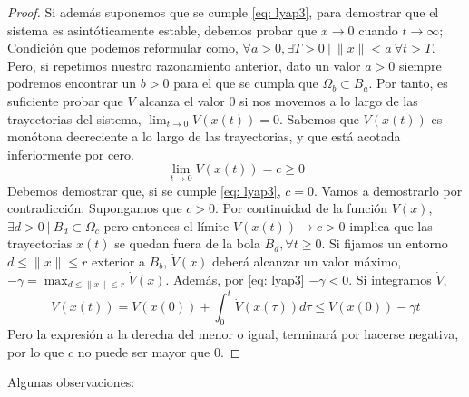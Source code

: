 \begin{proof}
Si además suponemos que se cumple \ref{eq: lyap3}, para demostrar que el sistema es asintóticamente estable, debemos probar que $x \to 0$ cuando $t \to \infty$; Condición que podemos reformular como, $\forall a >0, \exists T>0\ | \ \|x\| < a \ \forall t>T$. Pero, si repetimos nuestro razonamiento anterior, dato un valor $a>0$ siempre podremos encontrar un $b>0$ para el que se cumpla que $ \Omega_b \subset B_a$. Por tanto, es suficiente probar que $V$ alcanza el valor $0$ si nos movemos a lo largo de las trayectorias del sistema, $\lim_{t \to 0}V(x(t))=0$. Sabemos que $V(x(t))$ es monótona decreciente a lo largo de las trayectorias, y que está acotada inferiormente por cero.
\begin{equation}
\lim_{t \to 0}V(x(t))=c \geq 0
\end{equation}
Debemos demostrar que,  si se cumple \ref{eq: lyap3}, $c=0$. Vamos a demostrarlo por contradicción. Supongamos que $c>0$. Por continuidad de la función $V(x)$, $\exists d>0\ | \ B_d \subset \Omega_c$ pero entonces el límite $V(x(t))\to c>0$ implica que las trayectorias $x(t)$ se quedan fuera de la bola $B_d, \forall t \geq 0$. Si fijamos  un entorno $d \leq \|x\| \leq r$ exterior a $B_b$, $\dot V(x)$ deberá alcanzar un valor máximo, $-\gamma =\max_{d \leq \| x \| \leq r} \dot{V}(x)$. Además, por \ref{eq: lyap3} $-\gamma < 0$. Si integramos $\dot V$,
\begin{equation*}
V(x(t)) = V(x(0)) + \int_0^t \dot V(x(\tau))d\tau \leq V(x(0)) -\gamma t
\end{equation*}
Pero la expresión a la derecha del menor o igual, terminará por hacerse negativa, por lo que $c$ no puede ser mayor que 0.
\end{proof}
Algunas observaciones:
